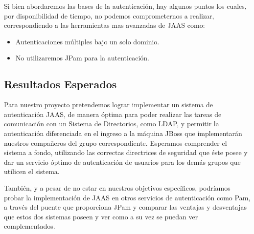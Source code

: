 	Si bien abordaremos las bases de la autenticación, hay algunos puntos los cuales, por disponibilidad de tiempo, no podemos comprometernos a realizar, correspondiendo a las herramientas mas avanzadas de JAAS como:

\begin{itemize}
\item Autenticaciones múltiples bajo un solo dominio.
\item No utilizaremos JPam para la autenticación.
\end{itemize}

	
\subsection{Resultados Esperados}
	Para nuestro proyecto pretendemos lograr implementar un sistema de autenticación JAAS, de manera
óptima para poder realizar las tareas de comunicación con un Sistema de Directorios, como LDAP, y
permitir la autenticación diferenciada en el ingreso a la máquina JBoss que implementarán nuestros
compañeros del grupo correspondiente. Esperamos comprender el sistema a fondo, utilizando las correctas
directrices de seguridad que éste posee y dar un servicio óptimo de autenticación de usuarios para los
demás grupos que utilicen el sistema.
	
También, y a pesar de no estar en nuestros objetivos específicos, podríamos probar la implementación de
JAAS en otros servicios de autenticación como Pam, a través del puente que proporciona JPam y comparar
las ventajas y desventajas que estos dos sistemas poseen y ver como a su vez se puedan ver
complementados.
		


